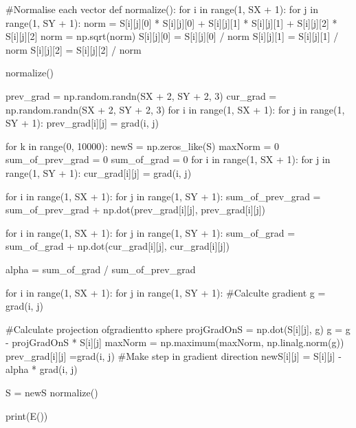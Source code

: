 \documentclass[ 12pt,x11names]{article}
\begin{document}
\begin{python}
#Normalise each vector
def normalize():
    for i in range(1, SX + 1):
        for j in range(1, SY + 1):
            norm = S[i][j][0] * S[i][j][0] + S[i][j][1] * S[i][j][1] + S[i][j][2] * S[i][j][2]
            norm = np.sqrt(norm)
            S[i][j][0] = S[i][j][0] / norm
            S[i][j][1] = S[i][j][1] / norm
            S[i][j][2] = S[i][j][2] / norm

normalize()

prev_grad =  np.random.randn(SX + 2, SY + 2, 3)
cur_grad = np.random.randn(SX + 2, SY + 2, 3)
for i in range(1, SX + 1):
    for j in range(1, SY + 1):
        prev_grad[i][j] = grad(i, j)

for k in range(0, 10000):
    newS = np.zeros_like(S)
    maxNorm = 0
    sum_of_prev_grad = 0
    sum_of_grad  =  0
    for i in range(1, SX + 1):
        for j in range(1, SY + 1):
            cur_grad[i][j] = grad(i,  j)

    for i in range(1, SX + 1):
        for j in range(1, SY + 1):
            sum_of_prev_grad = sum_of_prev_grad + np.dot(prev_grad[i][j], prev_grad[i][j])

    for i in range(1, SX + 1):
        for j in range(1, SY + 1):
            sum_of_grad = sum_of_grad + np.dot(cur_grad[i][j], cur_grad[i][j])

    alpha = sum_of_grad / sum_of_prev_grad

    for i in range(1, SX + 1):
        for j in range(1, SY + 1):
            #Calculte gradient
            g = grad(i,  j)

            #Calculate projection ofgradientto sphere
            projGradOnS = np.dot(S[i][j], g)
            g = g - projGradOnS * S[i][j]
            maxNorm = np.maximum(maxNorm, np.linalg.norm(g))
            prev_grad[i][j] =grad(i, j)
            #Make step in gradient direction
            newS[i][j] = S[i][j] - alpha * grad(i, j)

    S = newS
    normalize()

print(E())

 \end{python}
\end{document}
